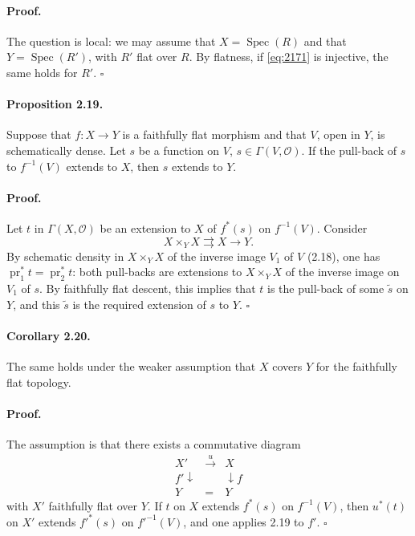 \documentclass[11pt]{article}
\newcommand{\Spec}{\operatorname{Spec}}
\newcommand{\calO}{\mathcal O}
\DeclareMathOperator{\pr}{pr}
\begin{document}
\paragraph{Proof.}
The question is local: we may assume that $X=\Spec(R)$ and that $Y=\Spec(R')$, with $R'$ flat over $R$. By flatness, if \eqref{eq:2171} is injective, the same holds for $R'$. \hfill $\square$

\paragraph{Proposition 2.19.}
Suppose that $f:X\to Y$ is a faithfully flat morphism and that $V$, open in $Y$, is schematically dense. Let $s$ be a function on $V$, $s\in\Gamma(V,\calO)$. If the pull-back of $s$ to $f^{-1}(V)$ extends to $X$, then $s$ extends to $Y$.

\paragraph{Proof.}
Let $t$ in $\Gamma(X,\calO)$ be an extension to $X$ of $f^*(s)$ on $f^{-1}(V)$. Consider
\[
X\times_Y X \rightrightarrows X\longrightarrow Y.
\]
By schematic density in $X\times_Y X$ of the inverse image $V_1$ of $V$ (2.18), one has $\pr_1^*t=\pr_2^*t$: both pull-backs are extensions to $X\times_Y X$ of the inverse image on $V_1$ of $s$. By faithfully flat descent, this implies that $t$ is the pull-back of some $\widetilde s$ on $Y$, and this $\widetilde s$ is the required extension of $s$ to $Y$. \hfill $\square$

\paragraph{Corollary 2.20.}
The same holds under the weaker assumption that $X$ covers $Y$ for the faithfully flat topology.

\paragraph{Proof.}
The assumption is that there exists a commutative diagram
\[
\begin{array}{ccc}
X'&\xrightarrow{u}&X\\
\scriptstyle f'\downarrow&&\downarrow\scriptstyle f\\
Y&=&Y
\end{array}
\]
with $X'$ faithfully flat over $Y$. If $t$ on $X$ extends $f^*(s)$ on $f^{-1}(V)$, then $u^*(t)$ on $X'$ extends $f'^*(s)$ on $f'^{-1}(V)$, and one applies 2.19 to $f'$. \hfill $\square$
\end{document}
